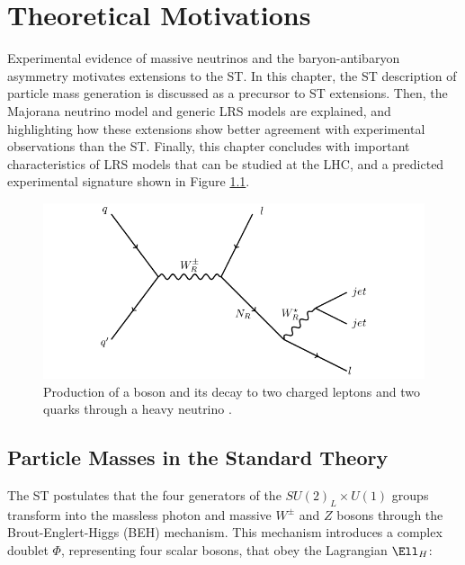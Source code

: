 \chapter{Theoretical Motivations}
\label{wrBosonAndHeavyNu}
Experimental evidence of massive neutrinos and the baryon-antibaryon asymmetry motivates extensions to the ST.  
In this chapter, the ST description of particle mass generation is discussed as a precursor to ST extensions.  
Then, the Majorana neutrino model and generic LRS models are explained, and highlighting how these extensions 
show better agreement with experimental observations than the ST.  Finally, this chapter concludes with 
important characteristics of LRS models that can be studied at the LHC, and a predicted experimental signature 
shown in Figure \ref{fig:wrFeynmanDiagram}.

\begin{figure}[h]
	\centering
	\includegraphics[width=1.0\textwidth]{figures/feynman.pdf}
	\caption{Production of a \WR boson and its decay to two charged leptons and two quarks through 
	a heavy neutrino \nul.}
	\label{fig:wrFeynmanDiagram}
\end{figure}


\section{Particle Masses in the Standard Theory}
\label{sec:massInSM}
The ST postulates that the four generators of the $SU(2)_{L} \times U(1)$ groups transform into the massless 
photon and massive $W^{\pm}$ and $Z$ bosons through the Brout-Englert-Higgs (BEH) mechanism.  This mechanism 
introduces a complex doublet $\Phi$, representing four scalar bosons, that obey the Lagrangian $\Ell_{H}$:

